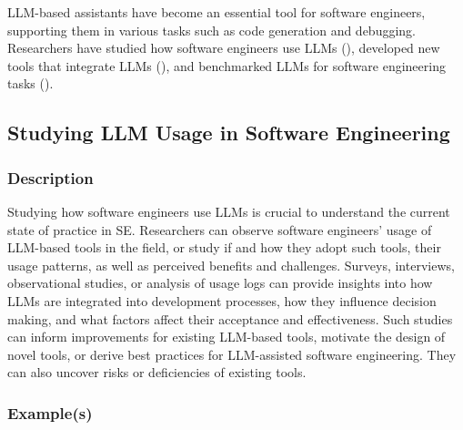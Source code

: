 LLM-based assistants have become an essential tool for software engineers, supporting them in various tasks such as code generation and debugging.
Researchers have studied how software engineers use LLMs (\llmusage), developed new tools that integrate LLMs (\newtools), and benchmarked LLMs for software engineering tasks (\benchmarkingtasks).


\subsection{Studying LLM Usage in Software Engineering}
\label{sec:studying-llm-usage-in-software-engineering}

\subsubsection{Description}

Studying how software engineers use LLMs is crucial to understand the current state of practice in SE.
Researchers can observe software engineers' usage of LLM-based tools in the field, or study if and how they adopt such tools, their usage patterns, as well as perceived benefits and challenges.
Surveys, interviews, observational studies, or analysis of usage logs can provide insights into how LLMs are integrated into development processes, how they influence decision making, and what factors affect their acceptance and effectiveness. 
Such studies can inform improvements for existing LLM-based tools, motivate the design of novel tools, or derive best practices for LLM-assisted software engineering.
They can also uncover risks or deficiencies of existing tools.

\subsubsection{Example(s)}

